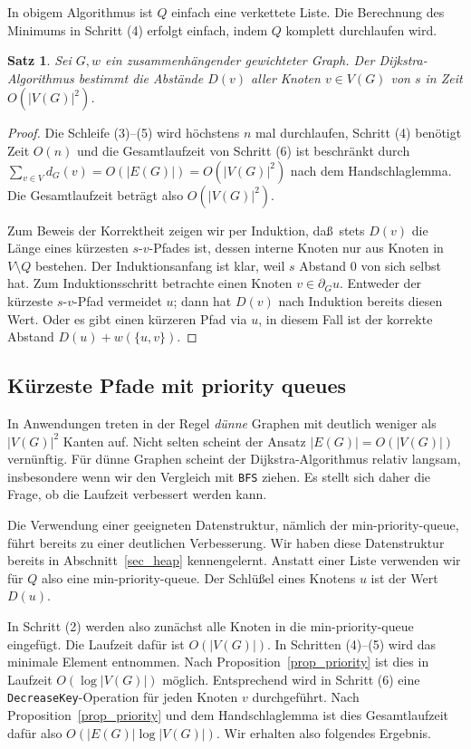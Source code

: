 \documentclass[10pt,reqno]{amsart}
\numberwithin{equation}{section}
\newtheorem{theorem}[definition]{Satz}
\newcommand\Prop{Proposition}
\begin{document}
In obigem Algorithmus ist $Q$ einfach eine verkettete Liste.
Die Berechnung des Minimums in Schritt (4) erfolgt einfach, indem $Q$ komplett durchlaufen wird.

\begin{theorem}
	Sei $G,w$ ein zusammenh\"angender gewichteter Graph.
	Der Dijkstra-Algorithmus bestimmt die Abst\"ande $D(v)$ aller Knoten $v\in V(G)$ von $s$ in Zeit $O(|V(G)|^2)$.
\end{theorem}
\begin{proof}
	Die Schleife (3)--(5) wird h\"ochstens $n$ mal durchlaufen, Schritt (4) ben\"otigt Zeit $O(n)$ und die Gesamtlaufzeit von Schritt (6) ist beschr\"ankt durch $\sum_{v\in V}d_G(v)=O(|E(G)|)=O(|V(G)|^2)$ nach dem Handschlaglemma.
	Die Gesamtlaufzeit betr\"agt also $O(|V(G)|^2)$.

	Zum Beweis der Korrektheit zeigen wir per Induktion, da\ss\ stets $D(v)$ die L\"ange eines k\"urzesten $s$-$v$-Pfades ist, dessen interne Knoten nur aus Knoten in $V\setminus Q$ bestehen.
	Der Induktionsanfang ist klar, weil $s$ Abstand $0$ von sich selbst hat.
	Zum Induktionsschritt betrachte einen Knoten $v\in\partial_G u$.
	Entweder der k\"urzeste $s$-$v$-Pfad vermeidet $u$; dann hat $D(v)$ nach Induktion bereits diesen Wert.
	Oder es gibt einen k\"urzeren Pfad via $u$, in diesem Fall ist der korrekte Abstand $D(u)+w(\{u,v\})$.
\end{proof}

\subsection{K\"urzeste Pfade mit priority queues}\label{sec_dijkstra_priority}
In Anwendungen treten in der Regel {\em d\"unne} Graphen mit deutlich weniger als $|V(G)|^2$ Kanten auf.
Nicht selten scheint der Ansatz $|E(G)|=O(|V(G)|)$ vern\"unftig. 
F\"ur d\"unne Graphen scheint der Dijkstra-Algorithmus relativ langsam, insbesondere wenn wir den Vergleich mit {\tt BFS} ziehen.
Es stellt sich daher die Frage, ob die Laufzeit verbessert werden kann.

Die Verwendung einer geeigneten Datenstruktur, n\"amlich der min-priority-queue, f\"uhrt bereits zu einer deutlichen Verbesserung.
Wir haben diese Datenstruktur bereits in Abschnitt~\ref{sec_heap} kennengelernt.
Anstatt einer Liste verwenden wir f\"ur $Q$ also eine min-priority-queue.
Der Schl\"u\ss el eines Knotens $u$ ist der Wert $D(u)$.

In Schritt (2) werden also zun\"achst alle Knoten in die min-priority-queue eingef\"ugt.
Die Laufzeit daf\"ur ist $O(|V(G)|)$.
In Schritten (4)--(5) wird das minimale Element entnommen. 
Nach \Prop~\ref{prop_priority} ist dies in  Laufzeit $O(\log|V(G)|)$ m\"oglich.
Entsprechend wird in Schritt (6) eine {\tt DecreaseKey}-Operation f\"ur jeden Knoten $v$ durchgef\"uhrt.
Nach \Prop~\ref{prop_priority} und dem Handschlaglemma ist dies Gesamtlaufzeit daf\"ur also $O(|E(G)|\log|V(G)|)$.
Wir erhalten also folgendes Ergebnis.
\end{document}
